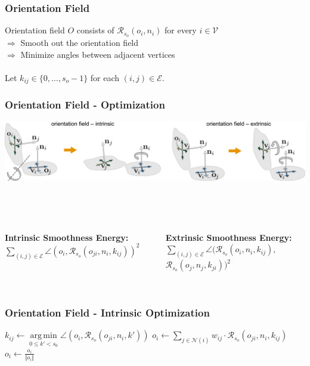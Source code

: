 \documentclass[aspectratio=43,sanserif,professionalfonts]{beamer}
\DeclareMathOperator*{\argmin}{arg\,min}
\begin{document}
\begin{frame}
	\frametitle{Orientation Field}
	Orientation field $O$ consists of $\mathcal{R}_{s_o}(o_i,n_i)$ for every $i \in \mathcal{V}$\\
	$\Rightarrow$ Smooth out the orientation field\\
	$\Rightarrow$ Minimize angles between adjacent vertices\\
	\pause
	~\\
	Let $k_{ij} \in \{0, \dots, s_o-1\}$ for each $(i,j) \in \mathcal{E}$.\\
\end{frame}

\begin{frame}
	\frametitle{Orientation Field - Optimization}
	\includegraphics[width=\textwidth]{img/orientation-field-intrinsic-extrinsic-horizontal.png}

	~\\~\\
	\begin{columns}
		\begin{column}{0.5\textwidth}
			\textbf{Intrinsic Smoothness Energy:}\\
			$\sum\limits_{(i,j) \in \mathcal{E}} \angle(o_i, \mathcal{R}_{s_o}(o_{ji}, n_i, k_{ij}))^2$\\~\\~\\
		\end{column}
		\begin{column}{0.5\textwidth}
			\textbf{Extrinsic Smoothness Energy:}\\
			$\sum\limits_{(i,j) \in \mathcal{E}} \angle(\mathcal{R}_{s_o}(o_{i}, n_i, k_{ij}),$\\
			\qquad\qquad $\mathcal{R}_{s_o}(o_{j}, n_j, k_{ji}))^2$
		\end{column}
	\end{columns}
\end{frame}

\begin{frame}
	\frametitle{Orientation Field - Intrinsic Optimization}
	\begin{algorithm}[H]
		{
			{
				$k_{ij} \leftarrow \argmin\limits_{0 \leq k' < s_0} \angle(o_i, \mathcal{R}_{s_o}(o_{ji}, n_i, k'))$
			}
			$o_i \leftarrow \sum\limits_{j \in \mathcal{N}(i)} w_{ij} \cdot \mathcal{R}_{s_o}(o_{ji}, n_i, k_{ij})$\\
			$o_i \leftarrow \frac{o_i}{\Vert o_i \Vert}$
		}
	\end{algorithm}
\end{frame}
\end{document}
